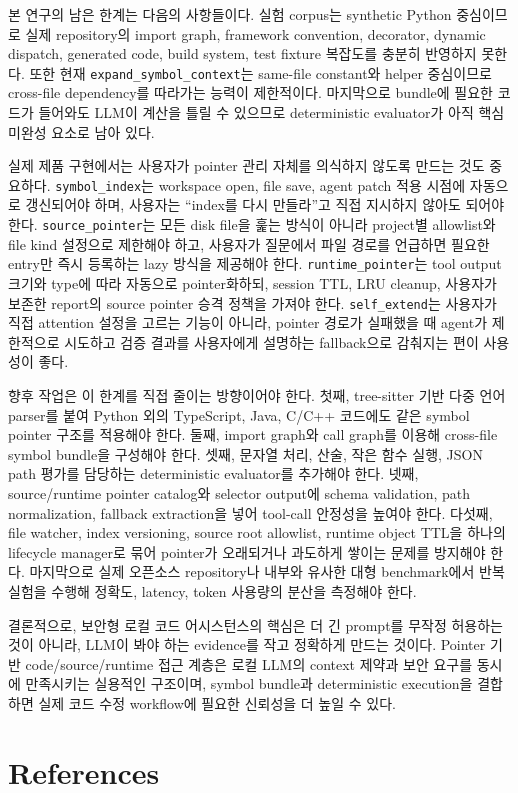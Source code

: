 \documentclass[11pt,a4paper]{article}
\begin{document}
본 연구의 남은 한계는 다음의 사항들이다. 실험 corpus는 synthetic Python 중심이므로 실제 repository의 import graph, framework convention, decorator, dynamic dispatch, generated code, build system, test fixture 복잡도를 충분히 반영하지 못한다. 또한 현재 \texttt{expand\_symbol\_context}는 same-file constant와 helper 중심이므로 cross-file dependency를 따라가는 능력이 제한적이다. 마지막으로 bundle에 필요한 코드가 들어와도 LLM이 계산을 틀릴 수 있으므로 deterministic evaluator가 아직 핵심 미완성 요소로 남아 있다.

실제 제품 구현에서는 사용자가 pointer 관리 자체를 의식하지 않도록 만드는 것도 중요하다. \texttt{symbol\_index}는 workspace open, file save, agent patch 적용 시점에 자동으로 갱신되어야 하며, 사용자는 ``index를 다시 만들라''고 직접 지시하지 않아도 되어야 한다. \texttt{source\_pointer}는 모든 disk file을 훑는 방식이 아니라 project별 allowlist와 file kind 설정으로 제한해야 하고, 사용자가 질문에서 파일 경로를 언급하면 필요한 entry만 즉시 등록하는 lazy 방식을 제공해야 한다. \texttt{runtime\_pointer}는 tool output 크기와 type에 따라 자동으로 pointer화하되, session TTL, LRU cleanup, 사용자가 보존한 report의 source pointer 승격 정책을 가져야 한다. \texttt{self\_extend}는 사용자가 직접 attention 설정을 고르는 기능이 아니라, pointer 경로가 실패했을 때 agent가 제한적으로 시도하고 검증 결과를 사용자에게 설명하는 fallback으로 감춰지는 편이 사용성이 좋다.

향후 작업은 이 한계를 직접 줄이는 방향이어야 한다. 첫째, tree-sitter 기반 다중 언어 parser를 붙여 Python 외의 TypeScript, Java, C/C++ 코드에도 같은 symbol pointer 구조를 적용해야 한다. 둘째, import graph와 call graph를 이용해 cross-file symbol bundle을 구성해야 한다. 셋째, 문자열 처리, 산술, 작은 함수 실행, JSON path 평가를 담당하는 deterministic evaluator를 추가해야 한다. 넷째, source/runtime pointer catalog와 selector output에 schema validation, path normalization, fallback extraction을 넣어 tool-call 안정성을 높여야 한다. 다섯째, file watcher, index versioning, source root allowlist, runtime object TTL을 하나의 lifecycle manager로 묶어 pointer가 오래되거나 과도하게 쌓이는 문제를 방지해야 한다. 마지막으로 실제 오픈소스 repository나 내부와 유사한 대형 benchmark에서 반복 실험을 수행해 정확도, latency, token 사용량의 분산을 측정해야 한다.

결론적으로, 보안형 로컬 코드 어시스턴스의 핵심은 더 긴 prompt를 무작정 허용하는 것이 아니라, LLM이 봐야 하는 evidence를 작고 정확하게 만드는 것이다. Pointer 기반 code/source/runtime 접근 계층은 로컬 LLM의 context 제약과 보안 요구를 동시에 만족시키는 실용적인 구조이며, symbol bundle과 deterministic execution을 결합하면 실제 코드 수정 workflow에 필요한 신뢰성을 더 높일 수 있다.

\clearpage
\section{References}
\begingroup
\renewcommand{\section}[2]{}


\endgroup
\end{document}
